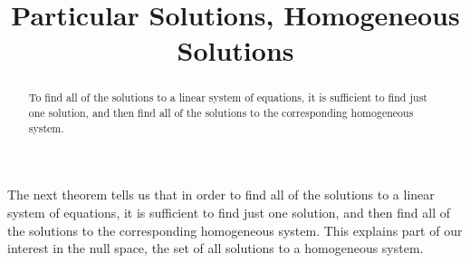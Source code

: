 \documentclass{ximera}
\title{Particular Solutions, Homogeneous Solutions}
\begin{document}
\begin{abstract}
  To find all of the solutions to a linear system of equations, it is
  sufficient to find just one solution, and then find all of the
  solutions to the corresponding homogeneous system.
\end{abstract}
\maketitle

The next theorem tells us that in order to find all of the solutions to a linear system of equations, it is sufficient to find just one solution, and then find all of the solutions to the corresponding homogeneous system.  This explains part of our interest in the null space, the set of all solutions to a homogeneous system.
\end{document}
